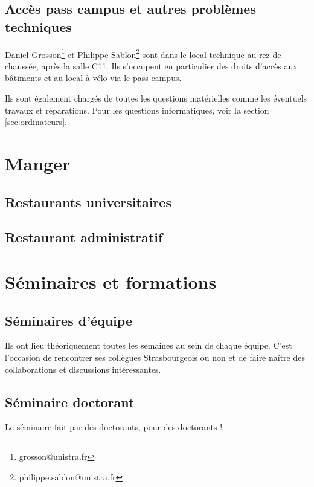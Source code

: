 \documentclass[a5paper]{article}
\begin{document}
\subsection{Accès pass campus et autres problèmes techniques}
\label{sec:technique}

Daniel Grosson\footnote{grosson@unistra.fr} et Philippe Sablon\footnote{philippe.sablon@unistra.fr} sont dans le local technique au rez-de-chaussée, après la salle C11. Ils s'occupent en particulier des droits d'accès aux bâtiments et au local à vélo via le pass campus.


Ils sont également chargés de toutes les questions matérielles comme les éventuels travaux et réparations. Pour les questions informatiques, voir la section \ref{sec:ordinateurs}.
\section{Manger}
\label{sec:manger}

\subsection{Restaurants universitaires}
\label{sec:rest-univ}

\subsection{Restaurant administratif}
\label{sec:rest-admin}

\section{Séminaires et formations}
\label{sec:seminaires-et}

\subsection{Séminaires d'équipe}
\label{sec:seminaires-dequipe}

Ils ont lieu théoriquement toutes les semaines au sein de chaque équipe. C'est l'occasion de rencontrer ses collègues Strasbourgeois ou non et de faire naître des collaborations et discussions intéressantes.

\subsection{Séminaire doctorant}
\label{sec:seminaire-doctorant}

Le séminaire fait par des doctorants, pour des doctorants !
\end{document}
